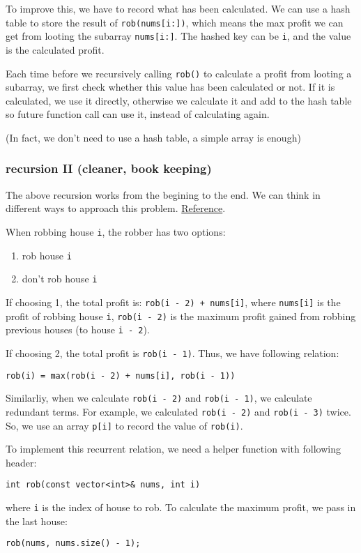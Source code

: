 \documentclass[11pt]{article}
\begin{document}
To improve this, we have to record what has been calculated. We can use a hash table to store the result of \texttt{rob(nums[i:])}, which means the max profit we can get from looting the subarray \texttt{nums[i:]}. The hashed key can be \texttt{i}, and the value is the calculated profit.

Each time before we recursively calling \texttt{rob()} to calculate a profit from looting a subarray, we first check whether this value has been calculated or not. If it is calculated, we use it directly, otherwise we calculate it and add to the hash table so future function call can use it, instead of calculating again.

(In fact, we don't need to use a hash table, a simple array is enough)
\subsubsection{recursion II (cleaner, book keeping)}
\label{sec:org4adac11}
The above recursion works from the begining to the end. We can think in different ways to approach this problem. \href{https://leetcode.com/problems/house-robber/discuss/156523/From-good-to-great.-How-to-approach-most-of-DP-problems.}{Reference}.

When robbing house \texttt{i}, the robber has two options:
\begin{enumerate}
\item rob house \texttt{i}
\item don't rob house \texttt{i}
\end{enumerate}

If choosing 1, the total profit is: \texttt{rob(i - 2) + nums[i]}, where \texttt{nums[i]} is the profit of robbing house \texttt{i}, \texttt{rob(i - 2)} is the maximum profit gained from robbing previous houses (to house \texttt{i - 2}).

If choosing 2, the total profit is \texttt{rob(i - 1)}. Thus, we have following relation:
\begin{Verbatim}[frame=single]
rob(i) = max(rob(i - 2) + nums[i], rob(i - 1))
\end{Verbatim}
Similarliy, when we calculate \texttt{rob(i - 2)} and \texttt{rob(i - 1)}, we calculate redundant terms. For example, we calculated \texttt{rob(i - 2)} and \texttt{rob(i - 3)} twice. So, we use an array \texttt{p[i]} to record the value of \texttt{rob(i)}.

To implement this recurrent relation, we need a helper function with following header:
\begin{verbatim}
int rob(const vector<int>& nums, int i)
\end{verbatim}
where \texttt{i} is the index of house to rob. To calculate the maximum profit, we pass in the last house:
\begin{verbatim}
rob(nums, nums.size() - 1);
\end{verbatim}
\end{document}
